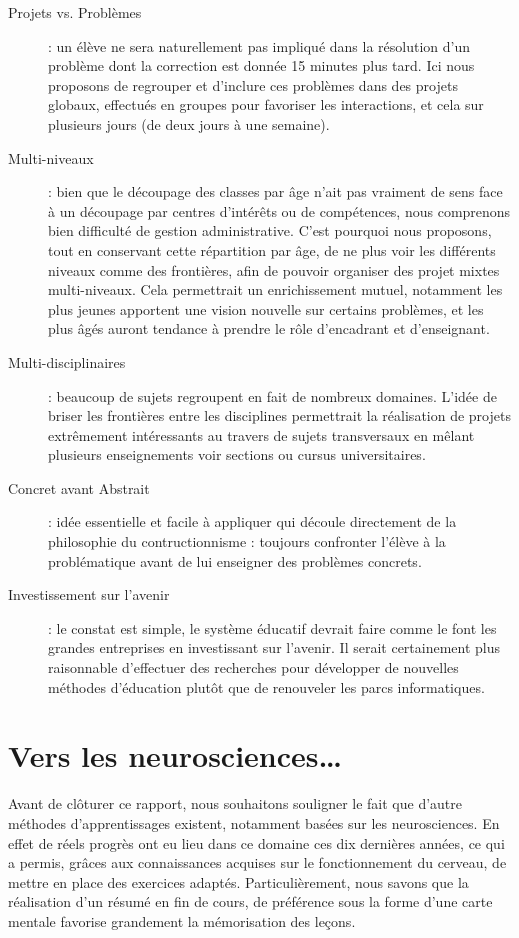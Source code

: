 \begin{description}
  \item[Projets vs. Problèmes] : un élève ne sera naturellement pas impliqué dans la résolution d'un problème dont la correction est donnée 15 minutes plus tard. Ici nous proposons de regrouper et d'inclure ces problèmes dans des projets globaux, effectués en groupes pour favoriser les interactions, et cela sur plusieurs jours (de deux jours à une semaine).
  \item[Multi-niveaux] : bien que le découpage des classes par âge n'ait pas vraiment de sens face à un découpage par centres d'intérêts ou de compétences, nous comprenons bien difficulté de gestion administrative. C'est pourquoi nous proposons, tout en conservant cette répartition par âge, de ne plus voir les différents niveaux comme des frontières, afin de pouvoir organiser des projet mixtes multi-niveaux. Cela permettrait un enrichissement mutuel, notamment les plus jeunes apportent une vision nouvelle sur certains problèmes, et les plus âgés auront tendance à prendre le rôle d'encadrant et d'enseignant.
  \item[Multi-disciplinaires] : beaucoup de sujets regroupent en fait de nombreux domaines. L'idée de briser les frontières entre les disciplines permettrait la réalisation de projets extrêmement intéressants au travers de sujets transversaux en mêlant plusieurs enseignements voir sections ou cursus universitaires.
  \item[Concret avant Abstrait] : idée essentielle et facile à appliquer qui découle directement de la philosophie du contructionnisme : toujours confronter l'élève à la problématique avant de lui enseigner des problèmes concrets.
  \item[Investissement sur l'avenir] : le constat est simple, le système éducatif devrait faire comme le font les grandes entreprises en investissant sur l'avenir. Il serait certainement plus raisonnable d'effectuer des recherches pour développer de nouvelles méthodes d'éducation plutôt que de renouveler les parcs informatiques.
\end{description}

\chapter*{Vers les neurosciences\ldots}
Avant de clôturer ce rapport, nous souhaitons souligner le fait que d'autre méthodes d'apprentissages existent, notamment basées sur les neurosciences. En effet de réels progrès ont eu lieu dans ce domaine ces dix dernières années, ce qui a permis, grâces aux connaissances acquises sur le fonctionnement du cerveau, de mettre en place des exercices adaptés. Particulièrement, nous savons que la réalisation d'un résumé en fin de cours, de préférence sous la forme d'une carte mentale favorise grandement la mémorisation des leçons.

